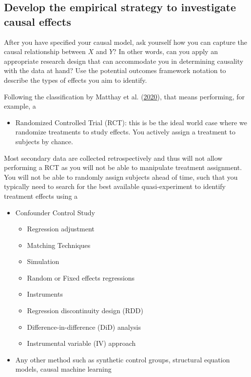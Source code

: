 \documentclass[
]{book}
\providecommand{\tightlist}{%
  \setlength{\itemsep}{0pt}\setlength{\parskip}{0pt}}
\begin{document}
\hypertarget{develop-the-empirical-strategy-to-investigate-causal-effects}{%
\subsection{Develop the empirical strategy to investigate causal
effects}\label{develop-the-empirical-strategy-to-investigate-causal-effects}}

After you have specified your causal model, ask yourself how you can
capture the causal relationship between \(X\) and \(Y\)? In other words,
can you apply an appropriate research design that can accommodate you in
determining causality with the data at hand? Use the potential outcomes
framework notation to describe the types of effects you aim to identify.

Following the classification by Matthay et al.
(\protect\hyperlink{ref-matthay_alternative_2020}{2020}), that means
performing, for example, a

\begin{itemize}
\tightlist
\item
  Randomized Controlled Trial (RCT): this is be the ideal world case
  where we randomize treatments to study effects. You actively assign a
  treatment to subjects by chance.
\end{itemize}

Most secondary data are collected retrospectively and thus will not
allow performing a RCT as you will not be able to manipulate treatment
assignment. You will not be able to randomly assign subjects ahead of
time, such that you typically need to search for the best available
quasi-experiment to identify treatment effects using a

\begin{itemize}
\item
  Confounder Control Study

  \begin{itemize}
  \tightlist
  \item
    Regression adjustment
  \item
    Matching Techniques
  \item
    Simulation
  \item
    Random or Fixed effects regressions
  \item
    Instruments
  \item
    Regression discontinuity design (RDD)
  \item
    Difference-in-difference (DiD) analysis
  \item
    Instrumental variable (IV) approach
  \end{itemize}
\item
  Any other method such as synthetic control groups, structural equation
  models, causal machine learning
\end{itemize}
\end{document}
